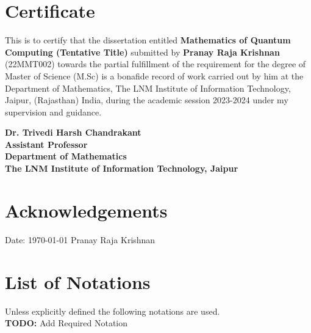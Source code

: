 \documentclass[12pt,twoside,fleqn]{report}
\theoremstyle{thmstyle}
\begin{document}
\renewcommand{\sectionmark}[1]{\markright{#1}}

\chapter*{Certificate}

This is to certify that the dissertation entitled \textbf{Mathematics of Quantum Computing (Tentative Title)} submitted by \textbf{Pranay Raja Krishnan} (22MMT002) towards the partial fulfillment of the requirement for the degree of Master of Science (M.Sc) is a bonafide record of work carried out by him at the Department of Mathematics, The LNM Institute of Information Technology, Jaipur, (Rajasthan) India, during the academic session 2023-2024 under my supervision and guidance. \\
\vspace*{3cm}
\begin{flushright}
	\hfill
	{\parbox{7cm}{\textbf{Dr. Trivedi Harsh Chandrakant\\
	Assistant Professor\\
	Department of Mathematics\\
	The LNM Institute of Information Technology, Jaipur}}}
\end{flushright}

\chapter*{Acknowledgements}

\lipsum[2]


\vspace*{3cm}
Date: \today
\hfill{}
Pranay Raja Krishnan

\chapter*{List of Notations}
Unless explicitly defined the following notations are used.\\
\textbf{TODO:} Add Required Notation \\
\end{document}

